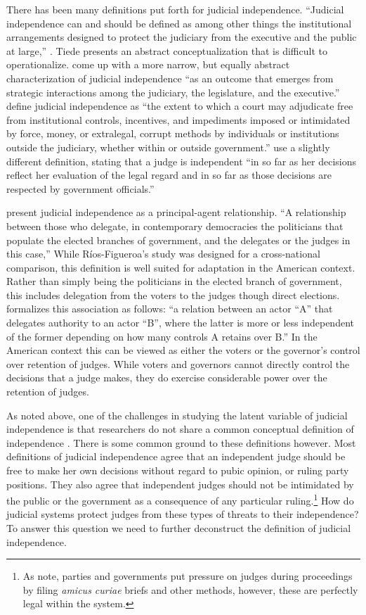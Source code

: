 \documentclass[12pt]{article}
\begin{document}
There has been many definitions put forth for judicial independence.  ``Judicial independence can and should be defined as among other things the institutional arrangements designed to protect the judiciary from the executive and the public at large,'' \citep[131]{Tiede2006}.  Tiede presents an abstract conceptualization that is difficult to operationalize.   \citet[108]{McNollgast2006} come up with a more narrow, but equally abstract characterization of  judicial independence ``as an outcome that emerges from strategic interactions among the judiciary, the legislature, and the executive.''  \citet[286]{Howard2004} define judicial independence as ``the extent to which a court may adjudicate free from institutional controls, incentives, and impediments imposed or intimidated by force, money, or extralegal, corrupt methods by individuals or institutions outside the judiciary, whether within or outside government.''  \citet[4]{Linzer2014} use a slightly different definition, stating that a judge is independent ``in so far as her decisions reflect her evaluation of the legal regard and in so far as those decisions are respected by government officials.''

\citet{Rios2006} present judicial independence as a principal-agent relationship.  ``A relationship between those who delegate, in contemporary democracies the politicians that populate the elected branches of government, and the delegates or the judges in this case,'' \citep[6
]{Rios2006}   While R\'{i}os-Figueroa's study was designed for a cross-national comparison, this definition is well suited for adaptation in the American context.  Rather than simply being the politicians in the elected branch of government, this includes delegation from the voters to the judges though direct elections.  \citet[17]{Rios2006} formalizes this association as follows: ``a relation between an actor ``A'' that delegates authority to an actor ``B'', where the latter is more or less independent of the former depending on how many controls A retains over B.''  In the American context this can be viewed as either the voters or the governor's control over retention of judges.  While voters and governors cannot directly control the decisions that a judge makes, they do exercise considerable power over the retention of judges.  

As noted above, one of the challenges in studying the latent variable of judicial independence is that researchers do not share a common conceptual definition of independence \citep{Linzer2014}.  There is some common ground to these definitions however.  Most definitions of judicial independence agree that an independent judge should be free to make her own decisions without regard to pubic opinion, or ruling party positions.  They also agree that independent judges should not be intimidated by the public or the government as a consequence of any particular ruling.\footnote{As \citet[4]{Rios2014} note, parties and governments put pressure on judges during proceedings by filing \textit{amicus curiae} briefs and other methods, however, these are perfectly legal within the system.}  How do judicial systems protect judges from these types of threats to their independence?  To answer this question we need to further deconstruct the definition of judicial independence. 
\end{document}
